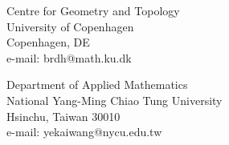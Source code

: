 \documentclass[12pt,twoside]{article}
\theoremstyle{plain}
\theoremstyle{definition}
\theoremstyle{remark}
\numberwithin{equation}{section}
\begin{document}

\printbibliography[title={References}]

\begin{center}
\textnormal{ \large Centre for Geometry and Topology \\
University of Copenhagen\\
Copenhagen, DE \\
e-mail: brdh@math.ku.dk}\\
\end{center}
\vspace{1cm}
\begin{center}
\textnormal{ \large Department of Applied Mathematics \\
National Yang-Ming Chiao Tung University \\
Hsinchu, Taiwan 30010 \\
e-mail: yekaiwang@nycu.edu.tw}\\
\end{center}


\end{document}
